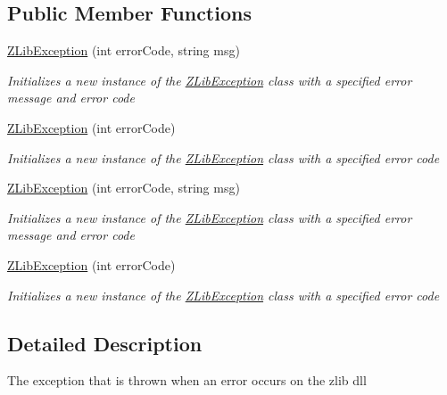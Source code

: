 \subsection*{Public Member Functions}
\begin{DoxyCompactItemize}
\item 
\hyperlink{class_dot_z_lib_1_1_z_lib_exception_a6a413e419130b98ef8a443a74b2f8ded}{Z\+Lib\+Exception} (int error\+Code, string msg)
\begin{DoxyCompactList}\small\item\em Initializes a new instance of the \hyperlink{class_dot_z_lib_1_1_z_lib_exception}{Z\+Lib\+Exception} class with a specified error message and error code \end{DoxyCompactList}\item 
\hyperlink{class_dot_z_lib_1_1_z_lib_exception_af8dd9c725ef7bd7b2d2042e827ce9fb7}{Z\+Lib\+Exception} (int error\+Code)
\begin{DoxyCompactList}\small\item\em Initializes a new instance of the \hyperlink{class_dot_z_lib_1_1_z_lib_exception}{Z\+Lib\+Exception} class with a specified error code \end{DoxyCompactList}\item 
\hyperlink{class_dot_z_lib_1_1_z_lib_exception_a6a413e419130b98ef8a443a74b2f8ded}{Z\+Lib\+Exception} (int error\+Code, string msg)
\begin{DoxyCompactList}\small\item\em Initializes a new instance of the \hyperlink{class_dot_z_lib_1_1_z_lib_exception}{Z\+Lib\+Exception} class with a specified error message and error code \end{DoxyCompactList}\item 
\hyperlink{class_dot_z_lib_1_1_z_lib_exception_af8dd9c725ef7bd7b2d2042e827ce9fb7}{Z\+Lib\+Exception} (int error\+Code)
\begin{DoxyCompactList}\small\item\em Initializes a new instance of the \hyperlink{class_dot_z_lib_1_1_z_lib_exception}{Z\+Lib\+Exception} class with a specified error code \end{DoxyCompactList}\end{DoxyCompactItemize}


\subsection{Detailed Description}
The exception that is thrown when an error occurs on the zlib dll 



